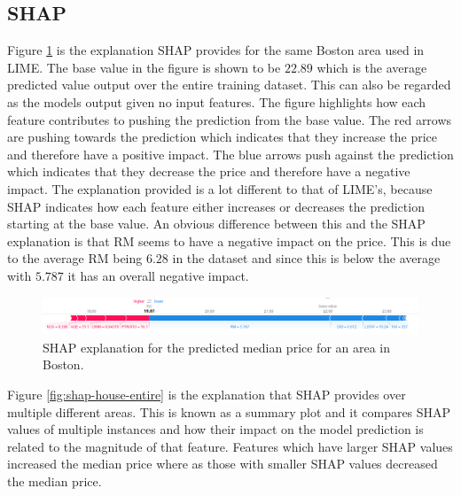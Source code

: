 \subsection{SHAP}
Figure \ref{fig:shap-house-single} is the explanation SHAP provides for the same Boston area used in LIME. The base value in the figure is shown to be $22.89$ which is the average predicted value output over the entire training dataset. This can also be regarded as the models output given no input features. The figure highlights how each feature contributes to pushing the prediction from the base value. The red arrows are pushing towards the prediction which indicates that they increase the price and therefore have a positive impact. The blue arrows push against the prediction which indicates that they decrease the price and therefore have a negative impact. The explanation provided is a lot different to that of LIME's, because SHAP indicates how each feature either increases or decreases the prediction starting at the base value. An obvious difference between this and the SHAP explanation is that RM seems to have a negative impact on the price. This is due to the average RM being $6.28$ in the dataset and since this is below the average with $5.787$ it has an overall negative impact.
\begin  {figure}[!htpb]
  \includegraphics[width=\linewidth]{Evaluation_Images/house_indv_shap.png}
  \caption{SHAP explanation for the predicted median price for an area in Boston.}
  \label{fig:shap-house-single}
\end{figure}
Figure \ref{fig:shap-house-entire} is the explanation that SHAP provides over multiple different areas. This is known as a summary plot and it compares SHAP values of multiple instances and how their impact on the model prediction is related to the magnitude of that feature. Features which have larger SHAP values increased the median price where as those with smaller SHAP values decreased the median price.
